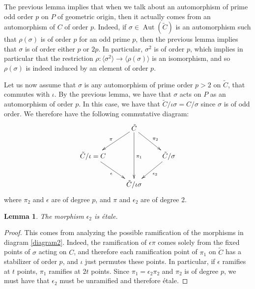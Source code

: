 \documentclass[preprint,12pt]{amsart}
\def\tC{\ensuremath{\tilde{C}}}
\theoremstyle{plain}
\newtheorem{lemma}[lemma]{Lemma}
\theoremstyle{definition}
\begin{document}
The previous lemma implies that when we talk about an automorphism of prime odd order $p$ on $P$ of geometric origin, then it actually comes from an automorphism of $C$ of order $p$.
Indeed, if $\sigma\in\operatorname{Aut}(\tC)$ is an automorphism such that $\rho(\sigma)$ is of order $p$ for an odd prime $p$, then the previous lemma implies that $\sigma$ is of order either $p$ or $2p$. In particular, $\sigma^2$ is of order $p$, which implies in particular that the restriction $\rho:\langle\sigma^2\rangle\to\langle\rho(\sigma)\rangle$ is an isomorphism, and so $\rho(\sigma)$ is indeed induced by an element of order $p$.

Let us now assume that $\sigma$ is any automorphism  of prime order $p>2$ on $\tilde{C}$, that commutes with $\iota$. By the previous lemma, we have that $\sigma$ acts on $P$ as an automorphism of order $p$.
In this case, we have that $\tC/\iota\sigma=C/\sigma$ since $\sigma$ is of odd order.
We therefore have the following commutative diagram:
\begin{equation}\label{diagram2}
 \xymatrix{
&\tC\ar[dl]_{\pi}\ar[dd]^{\pi_1}\ar[dr]^{\pi_2}&\\
\tC/\iota=C\ar[dr]_{\epsilon}&&\tC/\sigma\ar[dl]^{\epsilon_2}\\
&\tC/\iota\sigma&}
\end{equation}
 where $\pi_2$ and $\epsilon$ are of degree $p$, and $\pi$ and $\epsilon_2$ are of degree 2.

\begin{lemma}
The morphism $\epsilon_2$ is \'etale.
\end{lemma}
\begin{proof}
This comes from analyzing the possible ramification of the morphisms in diagram \eqref{diagram2}.
Indeed, the ramification of $\epsilon\pi$ comes solely from the fixed points of $\sigma$ acting on $C$, and therefore each ramification point of $\pi_1$ on $\tC$ has a stabilizer of order $p$, and $\iota$ just permutes these points.
In particular, if $\epsilon$ ramifies at $t$ points, $\pi_1$ ramifies at $2t$ points.
Since $\pi_1=\epsilon_2\pi_2$ and $\pi_2$ is of degree $p$, we must have that $\epsilon_2$ must be unramified and therefore \'etale.
\end{proof}
\end{document}
